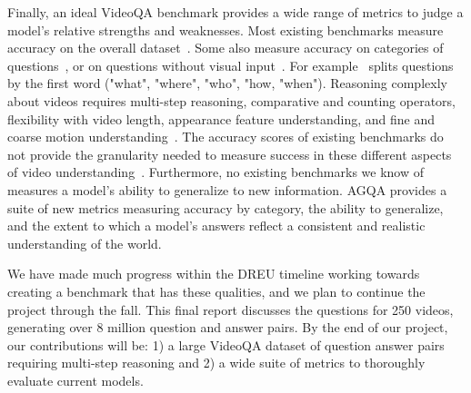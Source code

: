 \documentclass[10pt,twocolumn,letterpaper]{article}
\newcommand{\mgm}[1]{{\color{cyan}{mgm: #1}}}
\begin{document}
Finally, an ideal VideoQA benchmark provides a wide range of metrics to judge a model's relative strengths and weaknesses. Most existing benchmarks measure accuracy on the overall dataset~\cite{maharaj2017dataset,jang2017tgif,xu2017video,maharaj2017dataset,zeng2016leveraging,yu2019activitynet}. Some also measure accuracy on categories of questions~\cite{jang2017tgif,xu2017video,yu2019activitynet}, or on questions without visual input~\cite{zeng2016leveraging}. For example~\cite{xu2017video} splits questions by the first word ("what", "where", "who", "how, "when"). %
Reasoning complexly about videos requires multi-step reasoning, comparative and counting operators, flexibility with video length, appearance feature understanding, and fine and coarse motion understanding~\cite{le2020hierarchical,fan2019heterogeneous}. The accuracy scores of existing benchmarks do not provide the granularity needed to measure success in these different aspects of video understanding~\cite{fan2019heterogeneous,le2020hierarchical}. Furthermore, no existing benchmarks we know of measures a model's ability to generalize to new information. AGQA provides a suite of new metrics measuring accuracy by category, the ability to generalize, and the extent to which a model's answers reflect a consistent and realistic understanding of the world. 

We have made much progress within the DREU timeline working towards creating a benchmark that has these qualities, and we plan to continue the project through the fall. This final report discusses the questions for 250 videos, generating over 8 million question and answer pairs. By the end of our project, our contributions will be: 1) a large VideoQA dataset of question answer pairs requiring multi-step reasoning and 2) a wide suite of metrics to thoroughly evaluate current models.


\end{document}
